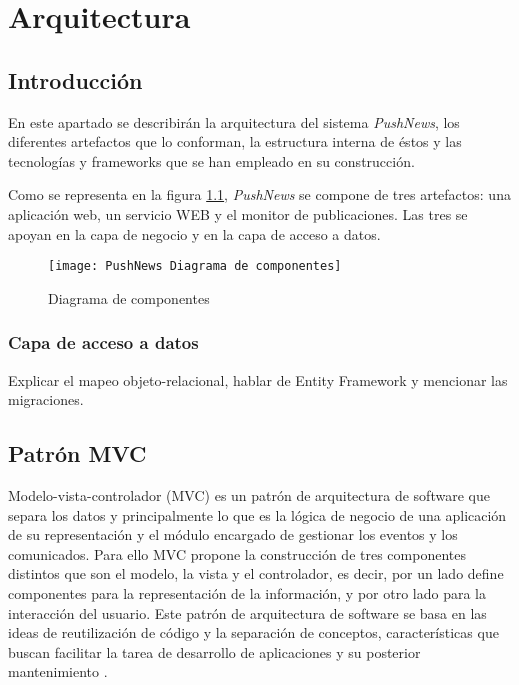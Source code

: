 \chapter{Arquitectura}

\section{Introducción}
En este apartado se describirán la arquitectura del sistema \emph{PushNews}, los diferentes artefactos que lo conforman, la estructura interna de éstos y las tecnologías y frameworks que se han empleado en su construcción.

Como se representa en la figura \ref{fig:diagrama-componentes}, \emph{PushNews} se compone de tres artefactos: una aplicación web, un servicio WEB y el monitor de publicaciones. Las tres se apoyan en la capa de negocio y en la capa de acceso a datos.

\begin{figure}[hb]
  \centering
  \texttt{[image: PushNews Diagrama de componentes]}
  \caption{Diagrama de componentes}
  \label{fig:diagrama-componentes}
\end{figure}

\subsection{Capa de acceso a datos}
Explicar el mapeo objeto-relacional, hablar de Entity Framework y mencionar las migraciones.

\section{Patrón MVC}

Modelo-vista-controlador (MVC) es un patrón de arquitectura de software que separa los datos y principalmente lo que es la lógica de negocio de una aplicación de su representación y el módulo encargado de gestionar los eventos y los comunicados. Para ello MVC propone la construcción de tres componentes distintos que son el modelo, la vista y el controlador, es decir, por un lado define componentes para la representación de la información, y por otro lado para la interacción del usuario. Este patrón de arquitectura de software se basa en las ideas de reutilización de código y la separación de conceptos, características que buscan facilitar la tarea de desarrollo de aplicaciones y su posterior mantenimiento \cite{wiki-mvc}.

